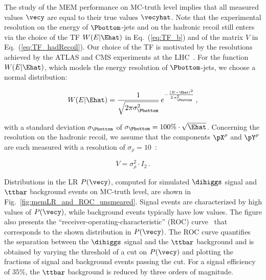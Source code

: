 The study of the MEM performance on MC-truth level implies that all measured values $\vecy$ are equal to their true values $\vecyhat$.
Note that the experimental resolution on the energy of $\Pbottom$-jets and on the hadronic recoil still enters via the choice of the TF $W(E|\Ehat)$ in Eq.~(\ref{eq:TF_b})
and of the matrix $V$ in Eq.~(\ref{eq:TF_hadRecoil}).
Our choice of the TF is motivated by the resolutions achieved by the ATLAS and CMS experiments at the LHC~\cite{Aaboud:2017aca,PRF-14-001,Aaboud:2018tkc,JME-17-001}.
For the function $W(E|\Ehat)$, which models the energy resolution of $\Pbottom$-jets,
we choose a normal distribution:
\begin{linenowrapper}
\begin{equation}
W(E|\Ehat) = \frac{1}{\sqrt{2 \pi \sigma_{\Pbottom}^{2}}} \, e^{-\frac{(E - \Ehat)^{2}}{2 \, \sigma_{\Pbottom}^{2}}} \, ,
\label{eq:resolution_b}
\end{equation}
\end{linenowrapper}
with a standard deviation $\sigma_{\Pbottom}$ of $\sigma_{\Pbottom} = 100\% \cdot \sqrt{\Ehat}$.
Concerning the resolution on the hadronic recoil,
we assume that the components $\pX^{\rho}$ and $\pY^{\rho}$ are each measured with a resolution of $\sigma_{\rho} = 10$~\GeV:
\begin{linenowrapper}
\begin{equation}
V = \sigma_{\rho}^{2} \cdot I_{2} \, .
\label{eq:resolution_rho}
\end{equation}
\end{linenowrapper}
Distributions in the LR $P(\vecy)$, computed for simulated $\dihiggs$ signal and $\ttbar$ background events on MC-truth level, are shown in Fig.~\ref{fig:memLR_and_ROC_unsmeared}.
Signal events are characterized by high values of $P(\vecy)$, while background events typically have low values.
The figure also presents the ``receiver-operating-characteristic'' (ROC) curve~\cite{ROCcurve} that corresponds to the shown distribution in $P(\vecy)$.
The ROC curve quantifies the separation between the $\dihiggs$ signal and the $\ttbar$ background
and is obtained by varying the threshold of a cut on $P(\vecy)$ and plotting the fractions of signal and background events passing the cut.
For a signal efficiency of $35\%$, the $\ttbar$ background is reduced by three orders of magnitude.


